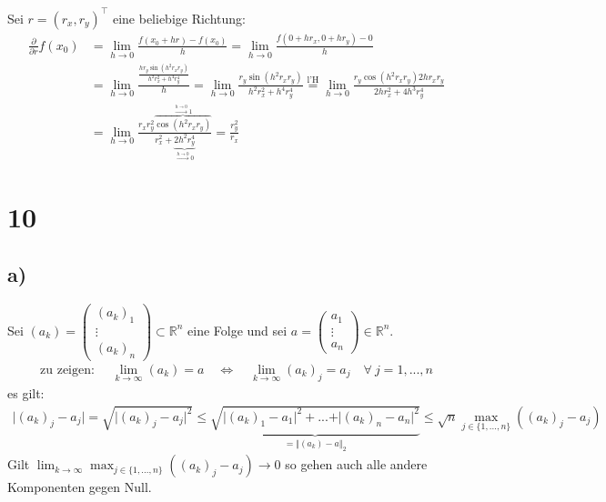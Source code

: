 \documentclass[11pt,a4paper]{article}
\newcommand {\Rn}	{\mathbb{R}^n}
\newcommand{\1}    	{\mathbbm{1}}
\begin{document}
	Sei \(r = (r_x, r_y)^\top\) eine beliebige Richtung:
	\begin{align*}
		\frac{\partial}{\partial r} f(x_0) &= 
		\lim_{h \rightarrow 0} \frac{f(x_0 + h r) - f(x_0)}{h} =
		\lim_{h \rightarrow 0} \frac{f(0 + h r_x, 0 + h r_y) - 0}{h} \\
		&= \lim_{h \rightarrow 0} \frac{\frac{h r_y \sin(h^2 r_x r_y)}{h^2 r_x^2 + h^4 r_y^4}}{h} = 
		\lim_{h \rightarrow 0} \frac{r_y \sin(h^2 r_x r_y)}{h^2 r_x^2 + h^4 r_y^4} \stackrel{\textrm{l'H}}{=} 
			\lim_{h \rightarrow 0} \frac{r_y \cos( h^2 r_x r_y) 2h r_x r_y}{2 h r_x^2 + 4h^3 r_y^4} \\
			&= \lim_{h \rightarrow 0} \frac{r_x r_y^2 \overbrace{\cos( h^2 r_x r_y)}^{\stackrel{h \rightarrow 0}{\rightarrow}1}}{r_x^2 + \underbrace{2h^2 r_y^4}_{\stackrel{h \rightarrow 0}{\rightarrow}0}} = \frac{r_y^2}{r_x}
	\end{align*}
	
	\section*{10}
	\subsection*{a)} Sei \((a_k) = \left( \begin{array}{c} (a_k)_1 \\ \vdots \\ (a_k)_n \end{array} \right) \subset \Rn\) eine Folge und sei \(a = \left( \begin{array}{c} a_1 \\ \vdots \\ a_n \end{array} \right) \in \Rn\).  
	\begin{align*}
		\textrm{zu zeigen: } \quad \lim_{k \rightarrow \infty} (a_k) = a \quad \Leftrightarrow \quad \lim_{k \rightarrow \infty} (a_k)_j = a_j \quad \forall~ j = 1, ..., n
	\end{align*}
	es gilt:
	\begin{align*}
		\vert (a_k)_j - a_j \vert = \sqrt{\vert (a_k)_j - a_j \vert^2} \leqslant 
		\underbrace{\sqrt{\vert (a_k)_1 - a_1 \vert^2 + ... + \vert (a_k)_n - a_n \vert^2}}_{= \Vert (a_k) - a \Vert_2}
		\leqslant \sqrt{n} \max_{j\in\{1,...,n\}} \left( (a_k)_j - a_j \right)
	\end{align*}
	Gilt \(\lim_{k \rightarrow \infty} \max_{j\in\{1,...,n\}} \left( (a_k)_j - a_j \right) \rightarrow 0\) so gehen auch alle andere Komponenten gegen Null.
	
\end{document}
